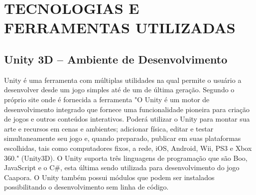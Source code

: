 \chapter{TECNOLOGIAS E FERRAMENTAS UTILIZADAS}
\label{cap:TECNOLOGIAS-E-FERRAMENTAS-UTILIZADAS}


\section{Unity 3D – Ambiente de Desenvolvimento}
\label{sec:Unity-3D-–-Ambiente-de-Desenvolvimento}

Unity é uma ferramenta com múltiplas utilidades na qual permite o usuário a desenvolver desde um jogo simples até de um de última geração.
Segundo o próprio site onde é fornecida a ferramenta "O Unity é um motor de desenvolvimento integrado que fornece uma funcionalidade pioneira para criação de jogos e outros conteúdos interativos. Poderá utilizar o Unity para montar sua arte e recursos em cenas e ambientes; adicionar física, editar e testar simultaneamente seu jogo e, quando preparado, publicar em suas plataformas escolhidas, tais como computadores fixos, a rede, iOS, Android, Wii, PS3 e Xbox 360." (Unity3D).
O Unity suporta três linguagens de programação que são Boo, JavaScript e o C\#, esta última sendo utilizada para desenvolvimento do jogo Caapora. O Unity também possui módulos que podem ser instalados possibilitando o desenvolvimento sem linha de código.


	\begin{figure}[h!]
		\centering
	\end{figure}
	
